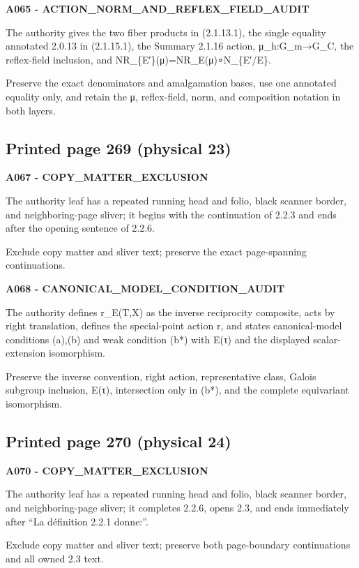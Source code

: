 \documentclass[10pt,a4paper]{article}
\begin{document}
\textbf{A065 - ACTION\_NORM\_AND\_REFLEX\_FIELD\_AUDIT}

The authority gives the two fiber products in (2.1.13.1), the single equality annotated 2.0.13 in (2.1.15.1), the Summary 2.1.16 action, μ\_h:G\_m→G\_C, the reflex-field inclusion, and NR\_\{E′\}(μ)=NR\_E(μ)∘N\_\{E′/E\}.

Preserve the exact denominators and amalgamation bases, use one annotated equality only, and retain the μ, reflex-field, norm, and composition notation in both layers.

\subsection{Printed page 269 (physical 23)}

\textbf{A067 - COPY\_MATTER\_EXCLUSION}

The authority leaf has a repeated running head and folio, black scanner border, and neighboring-page sliver; it begins with the continuation of 2.2.3 and ends after the opening sentence of 2.2.6.

Exclude copy matter and sliver text; preserve the exact page-spanning continuations.

\textbf{A068 - CANONICAL\_MODEL\_CONDITION\_AUDIT}

The authority defines r\_E(T,X) as the inverse reciprocity composite, acts by right translation, defines the special-point action r, and states canonical-model conditions (a),(b) and weak condition (b*) with E(τ) and the displayed scalar-extension isomorphism.

Preserve the inverse convention, right action, representative class, Galois subgroup inclusion, E(τ), intersection only in (b*), and the complete equivariant isomorphism.

\subsection{Printed page 270 (physical 24)}

\textbf{A070 - COPY\_MATTER\_EXCLUSION}

The authority leaf has a repeated running head and folio, black scanner border, and neighboring-page sliver; it completes 2.2.6, opens 2.3, and ends immediately after ``La définition 2.2.1 donne:''.

Exclude copy matter and sliver text; preserve both page-boundary continuations and all owned 2.3 text.
\end{document}
